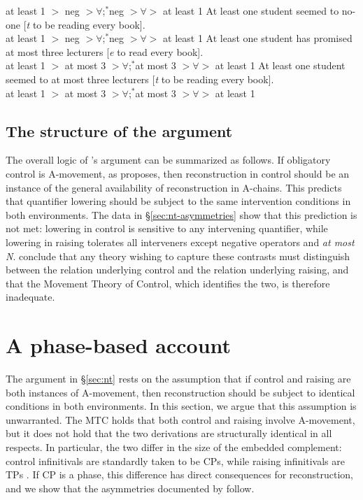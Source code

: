 \documentclass[12pt]{article}
\begin{document}
at least 1 $>$ neg $> \forall$;\quad $^*$neg $> \forall >$ at least 1
\a At least one student seemed to no-one [\emph{t} to be reading every book].\\
at least 1 $>$ neg $> \forall$;\quad $^*$neg $> \forall >$ at least 1
\xe
%
\pex\label{ex:nt-atmost}
\a At least one student has promised at most three lecturers [\emph{e} to read every book].\\
at least 1 $>$ at most 3 $> \forall$;\quad $^*$at most 3 $> \forall >$ at least 1
\a At least one student seemed to at most three lecturers [\emph{t} to be reading every book].\\
at least 1 $>$ at most 3 $> \forall$;\quad $^*$at most 3 $> \forall >$ at least 1
\xe

\subsection{The structure of the argument}\label{sec:nt-structure}

The overall logic of \citeauthor{neeleman2006}'s argument can be summarized as follows. If obligatory control is A-movement, as \citet{hornstein1999} proposes, then reconstruction in control should be an instance of the general availability of reconstruction in A-chains. This predicts that quantifier lowering should be subject to the same intervention conditions in both environments. The data in \S\ref{sec:nt-asymmetries} show that this prediction is not met: lowering in control is sensitive to any intervening quantifier, while lowering in raising tolerates all interveners except negative operators and \emph{at most N}. \citeauthor{neeleman2006} conclude that any theory wishing to capture these contrasts must distinguish between the relation underlying control and the relation underlying raising, and that the Movement Theory of Control, which identifies the two, is therefore inadequate.

\section{A phase-based account}\label{sec:response}

The argument in \S\ref{sec:nt} rests on the assumption that if control and raising are both instances of A-movement, then reconstruction should be subject to identical conditions in both environments. In this section, we argue that this assumption is unwarranted. The MTC holds that both control and raising involve A-movement, but it does not hold that the two derivations are structurally identical in all respects. In particular, the two differ in the size of the embedded complement: control infinitivals are standardly taken to be CPs, while raising infinitivals are TPs \citep{chomsky2001}. If CP is a phase, this difference has direct consequences for reconstruction, and we show that the asymmetries documented by \citeauthor{neeleman2006} follow.
\end{document}
